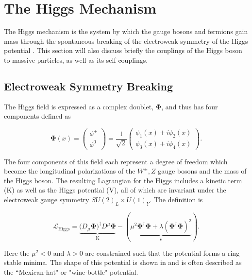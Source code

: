 \section{The Higgs Mechanism} \label{sec:theory:higgs}

The Higgs mechanism is the system by which the gauge bosons and fermions gain
mass through the spontaneous breaking of the electroweak symmetry of the Higgs
potential \cite{Higgs:1964ia,Higgs:1966ev,Thomson:2013zua}.  This section will
also discuss briefly the couplings of the Higgs boson to massive particles, as
well as its self couplings.

\subsection{Electroweak Symmetry Breaking}

The Higgs field is expressed as a complex doublet, $\boldsymbol{\Phi}$, and thus
has four components defined as

\begin{equation} \label{eq:higgs:higgs_field}
\boldsymbol{\Phi}(x) = \left( \begin{matrix} \phi^{+} \\ \phi^{0} \end{matrix}
\right) = \frac{1}{\sqrt{2}} \left( \begin{matrix} \phi_{1}(x) + i\phi_{2}(x) \\
\phi_{3}(x) + i\phi_{4}(x) \end{matrix} \right).
\end{equation}

The four components of this field each represent a degree of freedom which
become the longitudinal polarizations of the $W^{\pm},Z$ gauge bosons and the
mass of the Higgs boson.  The resulting Lagrangian for the Higgs includes a
kinetic term (K) as well as the Higgs potential (V), all of which are invariant
under the electroweak gauge symmetry $SU(2)_L \times U(1)_Y$.  The definition is

\begin{equation} \label{eq:higgs:lagrangian}
\mathcal{L}_{\text{Higgs}} =
\underbrace{(D_{\mu}\boldsymbol{\Phi)^{\dagger}}D^{\mu}\boldsymbol{\Phi}}_{\text{K}}
- (\underbrace{\mu^{2}\boldsymbol{\Phi}^{\dagger}\boldsymbol{\Phi} +
  \lambda(\boldsymbol{\Phi}^{\dagger}\boldsymbol{\Phi})^{2}}_{\text{V}}).
\end{equation}

Here the $\mu^{2} < 0$ and $\lambda > 0$ are constrained such that the
potential forms a ring stable minima.  The shape of this potential is shown in
 and is often described as the ``Mexican-hat" or
"wine-bottle" potential. 

